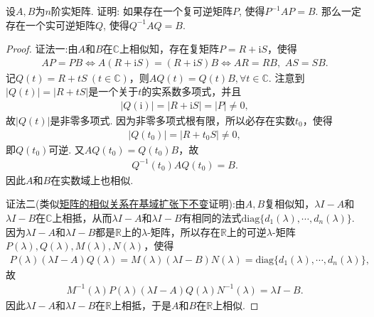 \documentclass[../../main.tex]{subfiles}%
\begin{document}
\begin{example}
设$A,B$为$n$阶实矩阵. 证明: 如果存在一个复可逆矩阵$P$, 使得$P^{-1}AP = B$. 那么一定存在一个实可逆矩阵$Q$, 使得$Q^{-1}AQ = B$.
\end{example}
\begin{proof}

{\color{blue}证法一:}由$A$和$B$在$\mathbb{C}$上相似知，存在复矩阵$P=R+\mathrm{i}S$，使得
\begin{align*}
AP=PB\Longleftrightarrow A(R+\mathrm{i}S)=(R+\mathrm{i}S)B\Longleftrightarrow AR=RB,\,\,AS=SB.
\end{align*}
记$Q(t)=R+tS\ (t\in\mathbb{C})$，则$AQ(t)=Q(t)B,\forall t\in\mathbb{C}$. 注意到$|Q(t)|=|R+tS|$是一个关于$t$的实系数多项式，并且
\begin{align*}
|Q(\mathrm{i})|=|R+\mathrm{i}S|=|P|\ne 0,
\end{align*}
故$|Q(t)|$是非零多项式. 因为非零多项式根有限，所以必存在实数$t_0$，使得
\begin{align*}
|Q(t_0)|=|R+t_0S|\ne 0,
\end{align*}
即$Q(t_0)$可逆. 又$AQ(t_0)=Q(t_0)B$，故
\begin{align*}
Q^{-1}(t_0)AQ(t_0)=B.
\end{align*}
因此$A$和$B$在实数域上也相似.

{\color{blue}证法二(类似\hyperref[corollary:矩阵的相似关系在基域扩张下不变]{矩阵的相似关系在基域扩张下不变}证明):}由$A,B$复相似知，$\lambda I-A$和$\lambda I-B$在$\mathbb{C}$上相抵，从而$\lambda I-A$和$\lambda I-B$有相同的法式$\mathrm{diag}\{d_1(\lambda),\cdots,d_n(\lambda)\}$. 因为$\lambda I-A$和$\lambda I-B$都是$\mathbb{R}$上的$\lambda$-矩阵，所以存在$\mathbb{R}$上的可逆$\lambda$-矩阵$P(\lambda),Q(\lambda),M(\lambda),N(\lambda)$，使得
\begin{align*}
P(\lambda)(\lambda I-A)Q(\lambda)=M(\lambda)(\lambda I-B)N(\lambda)=\mathrm{diag}\{d_1(\lambda),\cdots,d_n(\lambda)\},
\end{align*}
故
\begin{align*}
M^{-1}(\lambda)P(\lambda)(\lambda I-A)Q(\lambda)N^{-1}(\lambda)=\lambda I-B.
\end{align*}
因此$\lambda I-A$和$\lambda I-B$在$\mathbb{R}$上相抵，于是$A$和$B$在$\mathbb{R}$上相似.
\end{proof}
\end{document}
